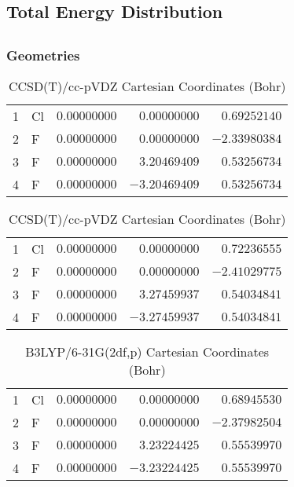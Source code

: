 \documentclass[10pt,oneside]{article}
\begin{document}
\begin{table}
\subsection*{Total Energy Distribution}
\centering\end{table}

\clearpage

\subsection{}

\begin{table}[h!]
\subsubsection*{Geometries}
\begin{multicols}{2}
\centering
\caption{CCSD(T)/cc-pVTZ Cartesian Coordinates (Bohr)}
\begin{tabular}{llrrr}
\toprule
1  & Cl & $ 0.00000000$ & $ 0.00000000$ & $ 0.69252140$ \\
2  & F  & $ 0.00000000$ & $ 0.00000000$ & $-2.33980384$ \\
3  & F  & $ 0.00000000$ & $ 3.20469409$ & $ 0.53256734$ \\
4  & F  & $ 0.00000000$ & $-3.20469409$ & $ 0.53256734$ \\
\bottomrule
\end{tabular}
\caption{CCSD(T)/cc-pVDZ Cartesian Coordinates (Bohr)}
\begin{tabular}{llrrr}
\toprule
1  & Cl & $ 0.00000000$ & $ 0.00000000$ & $ 0.72236555$ \\
2  & F  & $ 0.00000000$ & $ 0.00000000$ & $-2.41029775$ \\
3  & F  & $ 0.00000000$ & $ 3.27459937$ & $ 0.54034841$ \\
4  & F  & $ 0.00000000$ & $-3.27459937$ & $ 0.54034841$ \\
\bottomrule
\end{tabular}
\end{multicols}
\end{table}

\begin{table}[h]
\centering
\caption{B3LYP/6-31G(2df,p) Cartesian Coordinates (Bohr)}
\begin{tabular}{llrrr}
\toprule
1  & Cl & $ 0.00000000$ & $ 0.00000000$ & $ 0.68945530$ \\
2  & F  & $ 0.00000000$ & $ 0.00000000$ & $-2.37982504$ \\
3  & F  & $ 0.00000000$ & $ 3.23224425$ & $ 0.55539970$ \\
4  & F  & $ 0.00000000$ & $-3.23224425$ & $ 0.55539970$ \\
\bottomrule
\end{tabular}
\end{table}
\end{document}
